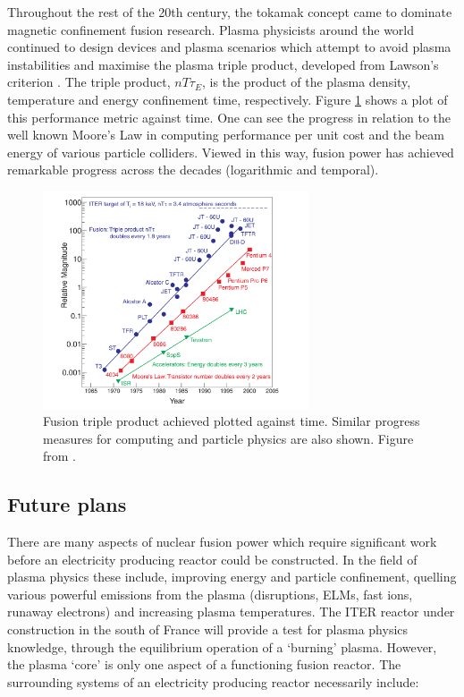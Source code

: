 Throughout the rest of the 20th century, the tokamak concept came to dominate magnetic confinement fusion research. Plasma physicists around the world continued to design devices and plasma scenarios which attempt to avoid plasma instabilities and maximise the plasma triple product, developed from Lawson's criterion \cite{lawson1955}. The triple product, $nT\tau_{E}$, is the product of the plasma density, temperature and energy confinement time, respectively. Figure \ref{fig:triple_product} shows a plot of this performance metric against time. One can see the progress in relation to the well known Moore's Law in computing performance per unit cost and the beam energy of various particle colliders. Viewed in this way, fusion power has achieved remarkable progress across the decades (logarithmic and temporal).

\begin{figure}
  \centering
  \includegraphics[width=0.7\textwidth]{triple_product.png}
  \caption[Comparison of performance as a function of time in various technical fields.]{Fusion triple product achieved plotted against time. Similar progress measures for computing and particle physics are also shown. Figure from \cite{Yamada2012}.}
  \label{fig:triple_product}
\end{figure}

\subsection{Future plans}
There are many aspects of nuclear fusion power which require significant work before an electricity producing reactor could be constructed. In the field of plasma physics these include, improving energy and particle confinement, quelling various powerful emissions from the plasma (disruptions, ELMs, fast ions, runaway electrons) and increasing plasma temperatures. The ITER  reactor under construction in the south of France will provide a test for plasma physics knowledge, through the equilibrium operation of a `burning' plasma. However, the plasma `core' is only one aspect of a functioning fusion reactor. The surrounding systems of an electricity producing reactor necessarily include:

